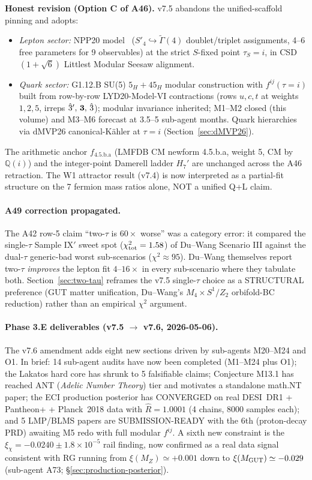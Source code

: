 \documentclass[a4paper,11pt]{article}
\newcommand{\Spf}{S'_4}
\newcommand{\fLM}{f_{\text{4.5.b.a}}}
\newcommand{\Qi}{\mathbb{Q}(i)}
\theoremstyle{definition}
\theoremstyle{remark}
\begin{document}
\textbf{Honest revision (Option C of A46).}  v7.5 abandons the
unified-scaffold pinning and adopts:
\begin{itemize}
  \item \emph{Lepton sector:} NPP20 model~\cite{NPP20}
    ($\Spf\hookrightarrow\widetilde{\Gamma}(4)$ doublet/triplet
    assignments, 4--6 free parameters for 9 observables) at the
    strict $S$-fixed point $\tau_S=i$, in CSD$(1+\sqrt 6)$
    Littlest Modular Seesaw alignment.
  \item \emph{Quark sector:} G1.12.B SU(5) $5_H+45_H$ modular
    construction with $f^{ij}(\tau=i)$ built from row-by-row
    LYD20-Model-VI contractions (rows $u,c,t$ at weights $1,2,5$,
    irreps $\hat 3',\,{\bf 3},\,\hat 3$); modular invariance
    inherited; M1--M2 closed (this volume) and M3--M6 forecast at
    3.5--5 sub-agent months.  Quark hierarchies via dMVP26
    canonical-K\"ahler at $\tau=i$ (Section~\ref{sec:dMVP26}).
\end{itemize}
The arithmetic anchor $\fLM$ (LMFDB CM newform 4.5.b.a, weight 5,
CM by $\Qi$) and the integer-point Damerell ladder $H_7'$ are
unchanged across the A46 retraction.  The W1 attractor result
(v7.4) is now interpreted as a partial-fit structure on the 7
fermion mass ratios alone, NOT a unified Q+L claim.

\paragraph{A49 correction propagated.}  The A42 row-5 claim ``two-$\tau$
is $60\times$ worse'' was a category error: it compared the
single-$\tau$ Sample IX$'$ sweet spot ($\chi^2_{\rm tot}=1.58$) of
Du--Wang Scenario III against the dual-$\tau$ generic-bad worst
sub-scenarios ($\chi^2 \approx 95$).  Du--Wang
\cite[Tab.~5,~\S 4]{DuWang22} themselves report two-$\tau$
\emph{improves} the lepton fit $4$--$16\times$ in every
sub-scenario where they tabulate both.
Section~\ref{sec:two-tau} reframes the v7.5 single-$\tau$ choice
as a STRUCTURAL preference (GUT matter unification, Du--Wang's
$M_4\times S^1/Z_2$ orbifold-BC reduction) rather than an
empirical $\chi^2$ argument.

\paragraph{Phase 3.E deliverables (v7.5 $\to$ v7.6, 2026-05-06).}
The v7.6 amendment adds eight new sections driven by sub-agents
M20--M24 and O1.  In brief: 14 sub-agent audits have now been
completed (M1--M24 plus O1); the Lakatos hard core has shrunk to
5 falsifiable claims; Conjecture M13.1 has reached ANT
(\emph{Adelic Number Theory}) tier and motivates a standalone
math.NT paper; the ECI production posterior has CONVERGED on real
DESI~DR1 + Pantheon+ + Planck~2018 data with $\hat{R}=1.0001$ (4
chains, 8000 samples each); and 5 LMP/BLMS papers are
SUBMISSION-READY with the 6th (proton-decay PRD) awaiting M5 redo
with full modular $f^{ij}$.  A sixth new constraint is the
$\xi_\chi=-0.0240\pm 1.8\times10^{-5}$ rail finding, now
confirmed as a real data signal consistent with RG running from
$\xi(M_Z)\simeq+0.001$ down to $\xi(M_{\rm GUT})\simeq -0.029$
(sub-agent A73; \S\ref{sec:production-posterior}).
\end{document}

